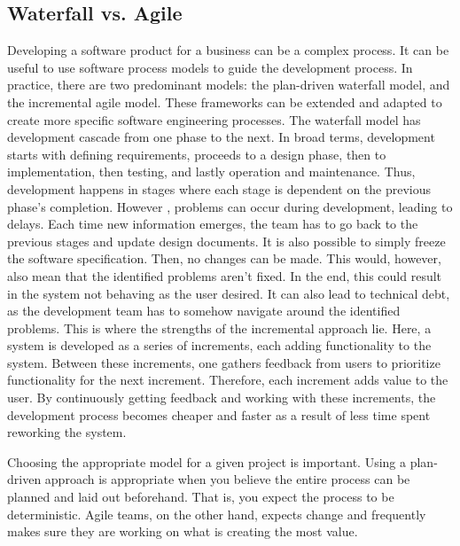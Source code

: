 
\subsection{Waterfall vs. Agile}
Developing a software product for a business can be a complex process.
It can be useful to use software process models to guide the development process.
In practice, there are two predominant models: the plan-driven waterfall model, and the incremental agile model.
These frameworks can be extended and adapted to create more specific software engineering processes.\cite{sommervilleSoftwareEngineering2016}
The waterfall model has development cascade from one phase to the next.
In broad terms, development starts with defining requirements, proceeds to a design phase, then to implementation, then testing, and lastly operation and maintenance.
Thus, development happens in stages where each stage is dependent on the previous phase's completion.
However , problems can occur during development, leading to delays. Each time new information emerges, the team has to go back to the previous stages and update design documents.
It is also possible to simply freeze the software specification. Then, no changes can be made. This would, however, also mean that the identified problems aren't fixed. In the end, this could result in the system not behaving as the user desired. It can also lead to technical debt, as the development team has to somehow navigate around the identified problems.
This is where the strengths of the incremental approach lie. Here, a system is developed as a series of increments, each adding functionality to the system. Between these increments, one gathers feedback from users to prioritize functionality for the next increment. Therefore, each increment adds value to the user. 
By continuously getting feedback and working with these increments, the development process becomes cheaper and faster as a result of less time spent reworking the system.\cite{sommervilleSoftwareEngineering2016}

Choosing the appropriate model for a given project is important.
Using a plan-driven approach is appropriate when you believe the entire process can be planned and laid out beforehand. That is, you expect the process to be deterministic.
Agile teams, on the other hand, expects change and frequently makes sure they are working on what is creating the most value.

